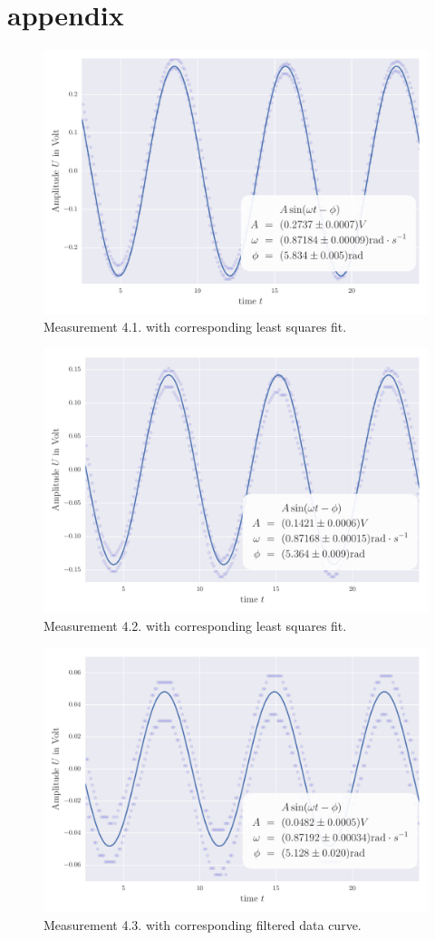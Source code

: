 \section{appendix}
\begin{figure}[H]
    \centering
    \includegraphics[width=0.7\linewidth]{analysis/figures/fit4_1}
    \caption{Measurement 4.1. with corresponding least squares fit.}
    \label{fig:4_1}
\end{figure}
\begin{figure}[H]
    \centering
    \includegraphics[width=0.7\linewidth]{analysis/figures/fit4_2}
    \caption{Measurement 4.2. with corresponding least squares fit.}
    \label{fig:4_2_plot}
\end{figure}
\begin{figure}[H]
    \centering
    \includegraphics[width=0.7\linewidth]{analysis/figures/fit4_3}
    \caption{Measurement 4.3. with corresponding filtered data curve.}
    \label{fig:4_3_plot}
\end{figure}
